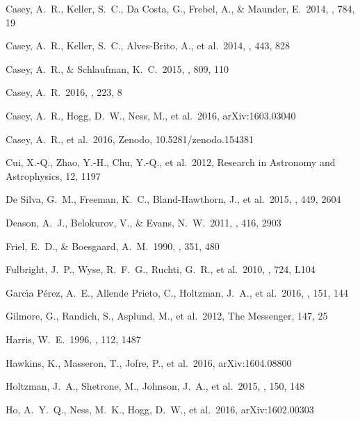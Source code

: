 \documentclass[preprint]{aastex}
\begin{document}
\begin{thebibliography}{dummy}
 Casey, A.~R., Keller, S.~C., Da Costa, G., Frebel, A., \& Maunder, E.\ 2014, \apj, 784, 19 

 Casey, A.~R., Keller, S.~C., Alves-Brito, A., et al.\ 2014, \mnras, 443, 828 

 Casey, A.~R., \& Schlaufman, K.~C.\ 2015, \apj, 809, 110 

 Casey, A.~R.\ 2016, \apjs, 223, 8 

 Casey, A.~R., Hogg, D.~W., Ness, M., et al.\ 2016, arXiv:1603.03040 

 Casey, A.~R., et al.\ 2016, Zenodo, 10.5281/zenodo.154381

 Cui, X.-Q., Zhao, Y.-H., Chu, Y.-Q., et al.\ 2012, Research in Astronomy and Astrophysics, 12, 1197 

 De Silva, G.~M., Freeman, K.~C., Bland-Hawthorn, J., et al.\ 2015, \mnras, 449, 2604 

 Deason, A.~J., Belokurov, V., \& Evans, N.~W.\ 2011, \mnras, 416, 2903 

 Friel, E.~D., \& Boesgaard, A.~M.\ 1990, \apj, 351, 480 

 Fulbright, J.~P., Wyse, R.~F.~G., Ruchti, G.~R., et al.\ 2010, \apjl, 724, L104 

 Garc{\'{\i}}a P{\'e}rez, A.~E., Allende Prieto, C., Holtzman, J.~A., et al.\ 2016, \aj, 151, 144 

 Gilmore, G., Randich, S., Asplund, M., et al.\ 2012, The Messenger, 147, 25

 Harris, W.~E.\ 1996, \aj, 112, 1487 

 Hawkins, K., Masseron, T., Jofre, P., et al.\ 2016, arXiv:1604.08800 

 Holtzman, J.~A., Shetrone, M., Johnson, J.~A., et al.\ 2015, \aj, 150, 148 

 Ho, A.~Y.~Q., Ness, M.~K., Hogg, D.~W., et al.\ 2016, arXiv:1602.00303 
 

\end{thebibliography}
\end{document}
